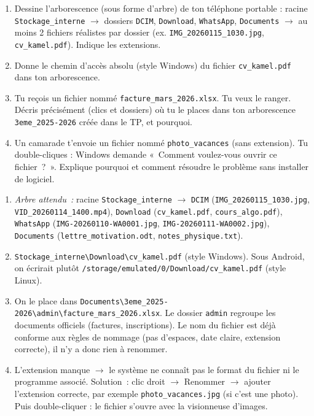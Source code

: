 \documentclass[11pt]{article}
\begin{document}
\begin{exercice}
\begin{enumerate}
    \item Dessine l'arborescence (sous forme d'arbre) de ton téléphone portable : racine \texttt{Stockage\_interne} $\rightarrow$ dossiers \texttt{DCIM}, \texttt{Download}, \texttt{WhatsApp}, \texttt{Documents} $\rightarrow$ au moins 2 fichiers réalistes par dossier (ex. \texttt{IMG\_20260115\_1030.jpg}, \texttt{cv\_kamel.pdf}). Indique les extensions.
    \item Donne le chemin d'accès absolu (style Windows) du fichier \texttt{cv\_kamel.pdf} dans ton arborescence.
    \item Tu reçois un fichier nommé \texttt{facture\_mars\_2026.xlsx}. Tu veux le ranger. Décris précisément (clics et dossiers) où tu le places dans ton arborescence \texttt{3eme\_2025-2026} créée dans le TP, et pourquoi.
    \item Un camarade t'envoie un fichier nommé \texttt{photo\_vacances} (sans extension). Tu double-cliques : Windows demande «~Comment voulez-vous ouvrir ce fichier~?~». Explique pourquoi et comment résoudre le problème sans installer de logiciel.
\end{enumerate}
\end{exercice}

\begin{corrige}
\begin{enumerate}
    \item \textit{Arbre attendu~:} racine \texttt{Stockage\_interne} $\rightarrow$ \texttt{DCIM} (\texttt{IMG\_20260115\_1030.jpg}, \texttt{VID\_20260114\_1400.mp4}), \texttt{Download} (\texttt{cv\_kamel.pdf}, \texttt{cours\_algo.pdf}), \texttt{WhatsApp} (\texttt{IMG-20260110-WA0001.jpg}, \texttt{IMG-20260111-WA0002.jpg}), \texttt{Documents} (\texttt{lettre\_motivation.odt}, \texttt{notes\_physique.txt}).
    \item \texttt{Stockage\_interne\textbackslash{}Download\textbackslash{}cv\_kamel.pdf} (style Windows). Sous Android, on écrirait plutôt \texttt{/storage/emulated/0/Download/cv\_kamel.pdf} (style Linux).
    \item On le place dans \texttt{Documents\textbackslash{}3eme\_2025-2026\textbackslash{}admin\textbackslash{}facture\_mars\_2026.xlsx}. Le dossier \texttt{admin} regroupe les documents officiels (factures, inscriptions). Le nom du fichier est déjà conforme aux règles de nommage (pas d'espaces, date claire, extension correcte), il n'y a donc rien à renommer.
    \item L'extension manque $\rightarrow$ le système ne connaît pas le format du fichier ni le programme associé. Solution~: clic droit $\rightarrow$ Renommer $\rightarrow$ ajouter l'extension correcte, par exemple \texttt{photo\_vacances.jpg} (si c'est une photo). Puis double-cliquer : le fichier s'ouvre avec la visionneuse d'images.
\end{enumerate}
\end{corrige}
\end{document}
